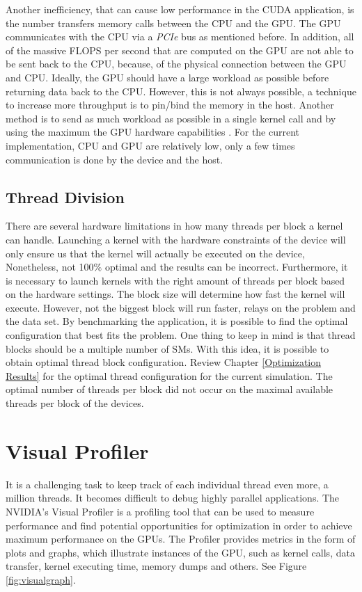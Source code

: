 Another inefficiency, that can cause low performance in the CUDA application, is the number transfers memory calls between the CPU and the GPU. The GPU communicates with the CPU via a \textit{PCIe} bus as mentioned before. In addition, all of the massive FLOPS per second that are computed on the GPU are not able to be sent back to the CPU, because, of the physical connection between the GPU and CPU. Ideally, the GPU should have a large workload as possible before returning data back to the CPU. However, this is not always possible, a technique to increase more throughput is to pin/bind the memory in the host. Another method is to send as much workload as possible in a single kernel call and by using the maximum the GPU hardware capabilities \cite{practices}. For the current implementation, CPU and GPU are relatively low, only a few times communication is done by the device and the host.

\subsection{Thread Division}

There are several hardware limitations in how many threads per block a kernel can handle. Launching a kernel with the hardware constraints of the device will only ensure us that the kernel will actually be executed on the device, Nonetheless, not 100$\%$ optimal and the results can be incorrect. Furthermore, it is necessary to launch kernels with the right amount of threads per block based on the hardware settings. The block size will determine how fast the kernel will execute. However, not the biggest block will run faster, relays on the problem and the data set. By benchmarking the application, it is possible to find the optimal configuration that best fits the problem. One thing to keep in mind is that thread blocks should be a multiple number of SMs. With this idea, it is possible to obtain optimal thread block configuration. Review Chapter \ref{Optimization Results} for the optimal thread configuration for the current simulation. The optimal number of threads per block did not occur on the maximal available threads per block of the devices.

\section{Visual Profiler}

It is a challenging task to keep track of each individual thread even more, a million threads. It becomes difficult to debug highly parallel applications. The NVIDIA's Visual Profiler is a profiling tool that can be used to measure performance and find potential opportunities for optimization in order to achieve maximum performance on the GPUs. The Profiler provides metrics in the form of plots and graphs, which illustrate instances of the GPU, such as kernel calls, data transfer, kernel executing time, memory dumps and others. See Figure \ref{fig:visualgraph}.

